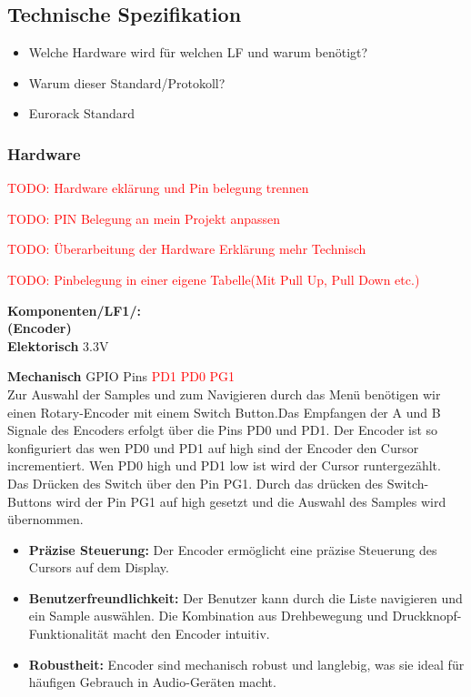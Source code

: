 \newpage
\subsection{Technische Spezifikation}
\begin{itemize}
    \item Welche Hardware wird für welchen LF und warum benötigt?
    \item Warum dieser Standard/Protokoll?
    \item Eurorack Standard
\end{itemize}


\subsubsection{Hardware}

\textcolor{red}{TODO: Hardware eklärung und Pin belegung trennen}

\textcolor{red}{TODO: PIN Belegung an mein Projekt anpassen}

\textcolor{red}{TODO: Überarbeitung der Hardware Erklärung mehr Technisch}

\textcolor{red}{TODO: Pinbelegung in einer eigene Tabelle(Mit Pull Up, Pull Down etc.)}

\textbf{Komponenten/LF1/:} \\


\textbf{(Encoder)} \\

\textbf{Elektorisch} 3.3V

\textbf{Mechanisch} GPIO Pins \textcolor{red}{PD1 PD0 PG1}
 \\

Zur Auswahl der Samples und zum Navigieren durch das Menü benötigen wir einen Rotary-Encoder mit einem Switch Button.Das Empfangen der A und B Signale des Encoders erfolgt über die Pins PD0 und PD1. Der Encoder ist so konfiguriert das wen PD0 und PD1 auf high sind der Encoder den Cursor incrementiert. Wen PD0 high und PD1 low ist wird der Cursor runtergezählt.
Das Drücken des Switch über den Pin PG1. Durch das drücken des Switch-Buttons wird der Pin PG1 auf high gesetzt und die Auswahl des Samples wird übernommen.

\begin{itemize}
    \item \textbf{Präzise Steuerung:} Der Encoder ermöglicht eine präzise Steuerung des Cursors auf dem Display.
    
    \item \textbf{Benutzerfreundlichkeit:} Der Benutzer kann durch die Liste navigieren und ein Sample auswählen. Die Kombination aus Drehbewegung und Druckknopf-Funktionalität macht den Encoder intuitiv.
    
    \item \textbf{Robustheit:} Encoder sind mechanisch robust und langlebig, was sie ideal für häufigen Gebrauch in Audio-Geräten macht.
\end{itemize}





